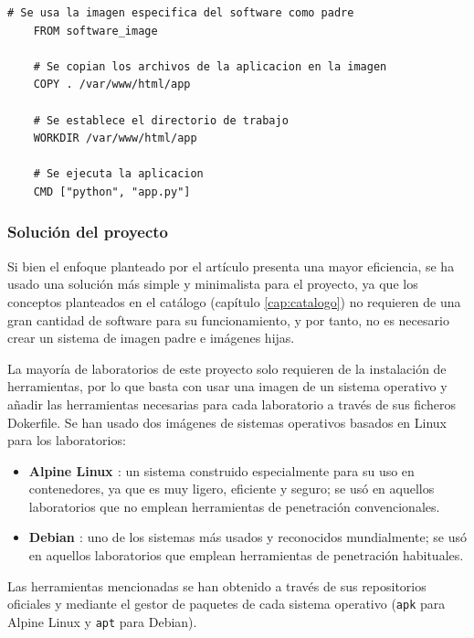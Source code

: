                 \begin{lstlisting}[style=dockerfile_style, caption={Dockerfile de una imagen secundaria (hija)}]
    # Se usa la imagen especifica del software como padre
    FROM software_image

    # Se copian los archivos de la aplicacion en la imagen
    COPY . /var/www/html/app

    # Se establece el directorio de trabajo
    WORKDIR /var/www/html/app

    # Se ejecuta la aplicacion
    CMD ["python", "app.py"]
                \end{lstlisting}

            \subsubsection{Solución del proyecto}

                Si bien el enfoque planteado por el artículo presenta una mayor eficiencia, se ha usado una solución más simple y minimalista para el proyecto, ya que los conceptos planteados en el catálogo (capítulo \ref{cap:catalogo}) no requieren de una gran cantidad de software para su funcionamiento, y por tanto, no es necesario crear un sistema de imagen padre e imágenes hijas.

                La mayoría de laboratorios de este proyecto solo requieren de la instalación de herramientas, por lo que basta con usar una imagen de un sistema operativo y añadir las herramientas necesarias para cada laboratorio a través de sus ficheros Dokerfile. Se han usado dos imágenes de sistemas operativos basados en Linux para los laboratorios:

                \begin{itemize}
                    \item \textbf{Alpine Linux \cite{alpine}}: un sistema construido especialmente para su uso en contenedores, ya que es muy ligero, eficiente y seguro; se usó en aquellos laboratorios que no emplean herramientas de penetración convencionales.
                    \item \textbf{Debian \cite{debian}}: uno de los sistemas más usados y reconocidos mundialmente; se usó en aquellos laboratorios que emplean herramientas de penetración habituales.
                \end{itemize}

                Las herramientas mencionadas se han obtenido a través de sus repositorios oficiales y mediante el gestor de paquetes de cada sistema operativo (\texttt{apk} para Alpine Linux y \texttt{apt} para Debian).

